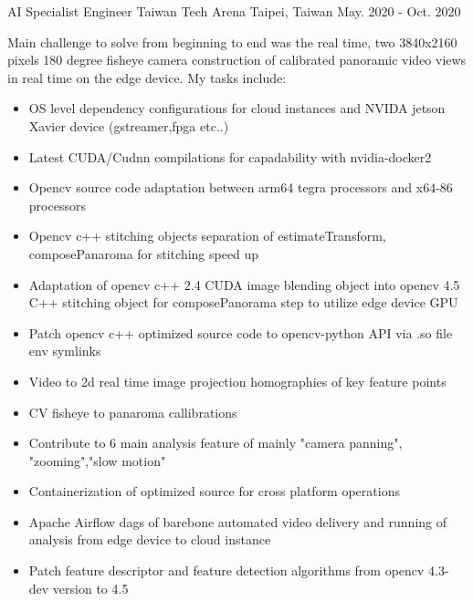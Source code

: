 \begin{cventries}
  \cventry
    {AI Specialist Engineer} %
    {Taiwan Tech Arena} %
    {Taipei, Taiwan} %
    {May. 2020 - Oct. 2020} %
    {
      {\footnotesize Main challenge to solve from beginning to end was the real time, two 3840x2160 pixels 180 degree fisheye camera construction of calibrated panoramic video views in real time on the edge device.\newline}
             {My tasks include:}
             \begin{itemize}
                \setlength\itemsep{0em}
                \item {\scriptsize OS level dependency configurations for cloud instances and NVIDA jetson Xavier device (gstreamer,fpga etc..)}  
                \item {\scriptsize Latest CUDA/Cudnn compilations for capadability with nvidia-docker2}
                \item {\scriptsize Opencv source code adaptation between arm64 tegra processors and x64-86 processors}
                \item {\scriptsize Opencv c++ stitching objects separation of estimateTransform, composePanaroma for stitching speed up}
                \item {\scriptsize Adaptation of opencv c++ 2.4 CUDA image blending object into opencv 4.5 C++ stitching object for composePanorama step to utilize edge device GPU}
                \item {\scriptsize Patch opencv c++ optimized source code to opencv-python API via .so file env symlinks}
                \item {\scriptsize Video to 2d real time image projection homographies of key feature points}
                \item {\scriptsize CV fisheye to panaroma callibrations}
                \item {\scriptsize Contribute to 6 main analysis feature of mainly "camera panning", "zooming","slow motion"}
                \item {\scriptsize Containerization of optimized source for cross platform operations}
                \item {\scriptsize Apache Airflow dags of barebone automated video delivery and running of analysis from edge device to cloud instance}
                \item {\scriptsize Patch feature descriptor and feature detection algorithms from opencv 4.3-dev version to 4.5 }

\end{itemize}}
\end{cventries}
